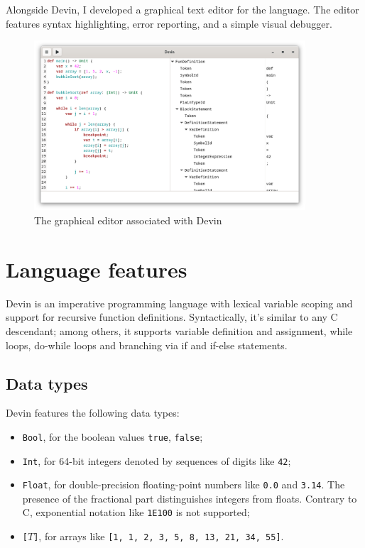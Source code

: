 \documentclass[UdineBachThesis,american,11pt]{PhdThesis}
\begin{document}
  Alongside Devin, I developed a graphical text editor for the language. The
  editor features syntax highlighting, error reporting, and a simple visual
  debugger.

  \begin{figure}[H]
    \centering
    \includegraphics[width=0.9\textwidth]{2.png}
    \caption{The graphical editor associated with Devin}
  \end{figure}

  \newpage

  \section{Language features}

  Devin is an imperative programming language with lexical variable scoping and
  support for recursive function definitions. Syntactically, it's similar to any
  C descendant; among others, it supports variable definition and assignment,
  while loops, do-while loops and branching via if and if-else statements.

  \subsection{Data types}

  Devin features the following data types:

  \begin{itemize}
    \item \mbox{\texttt{Bool}}, for the boolean values \mbox{\texttt{true}},
    \mbox{\texttt{false}};

    \item \mbox{\texttt{Int}}, for 64-bit integers denoted by sequences of
    digits like \mbox{\texttt{42}};

    \item \mbox{\texttt{Float}}, for double-precision floating-point numbers
    like \mbox{\texttt{0.0}} and \mbox{\texttt{3.14}}. The presence of the
    fractional part distinguishes integers from floats. Contrary to C,
    exponential notation like \mbox{\texttt{1E100}} is not supported;

    \item \mbox{\texttt{[$T$]}}, for arrays like
    \mbox{\texttt{[1, 1, 2, 3, 5, 8, 13, 21, 34, 55]}}.
  \end{itemize}
\end{document}
